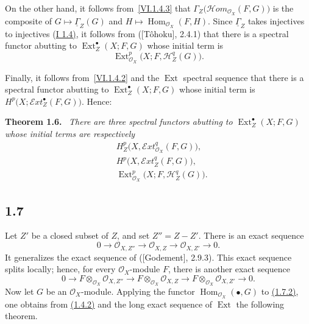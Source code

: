 \documentclass[11pt,a4paper,oneside]{book}
\providecommand{\SheafGamma}{\underline{\Gamma}}
\providecommand{\SheafH}{\mathcal H}
\providecommand{\SheafHom}{\mathcal H\!om}
\providecommand{\SheafExt}{\mathcal E\!xt}
\providecommand{\OX}{\mathcal O_X}
\providecommand{\OXZ}[1]{\mathcal O_{X,#1}}
\providecommand{\Homop}{\operatorname{Hom}}
\providecommand{\Ext}{\operatorname{Ext}}
\newenvironment{sgastatement}[1]
  {\par\addvspace{0.8\baselineskip}\noindent\textbf{#1.}\ \itshape}
  {\par\addvspace{0.35\baselineskip}}
\theoremstyle{plain}
\theoremstyle{definition}
\theoremstyle{remark}
\begin{document}
On the other hand, it follows from~\eqref{VI.1.4.3} that
$\Gamma_Z\bigl(\SheafHom_{\OX}(F,G)\bigr)$ is the composite of
$G\longmapsto\SheafGamma_Z(G)$ and
$H\longmapsto\Homop_{\OX}(F,H)$. Since $\SheafGamma_Z$ takes injectives to
injectives \textup{(\hyperref[I.1.4]{I 1.4)}}, it follows from \textup{([T\^ohoku], 2.4.1)}
that there is a spectral functor abutting to $\Ext_Z^{\bullet}(X;F,G)$ whose
initial term is
\[
 \Ext_{\OX}^p\bigl(X;F,\SheafH_Z^q(G)\bigr).
\]

Finally, it follows from~\eqref{VI.1.4.2} and the $\Ext$ spectral sequence
that there is a spectral functor abutting to $\Ext_Z^{\bullet}(X;F,G)$ whose
initial term is $H^p\bigl(X;\SheafExt_Z^{\bullet}(F,G)\bigr)$. Hence:

\begin{sgastatement}{Theorem 1.6}
There are three spectral functors abutting to
$\Ext_Z^{\bullet}(X;F,G)$ whose initial terms are respectively
\begin{align}
 &H_Z^p\bigl(X,\SheafExt_{\OX}^q(F,G)\bigr),
   \tag{1.6.1}\label{VI.1.6.1}\\[-0.15em]
 &H^p\bigl(X,\SheafExt_Z^q(F,G)\bigr),
   \tag{1.6.2}\label{VI.1.6.2}\\[-0.15em]
 &\Ext_{\OX}^p\bigl(X;F,\SheafH_Z^q(G)\bigr).
   \tag{1.6.3}\label{VI.1.6.3}
\end{align}
\end{sgastatement}

\subsection*{1.7}
Let $Z'$ be a closed subset of $Z$, and set $Z''=Z-Z'$. There is an exact
sequence
\begin{equation}
 0\longrightarrow \OXZ{Z''}\longrightarrow \OXZ{Z}
 \longrightarrow \OXZ{Z'}\longrightarrow 0.
 \tag{1.7.1}\label{VI.1.7.1}
\end{equation}
It generalizes the exact sequence of \textup{([Godement], 2.9.3)}. This exact
sequence splits locally; hence, for every $\OX$-module $F$, there is another
exact sequence
\begin{equation}
 0\longrightarrow F\otimes_{\OX}\OXZ{Z''}
 \longrightarrow F\otimes_{\OX}\OXZ{Z}
 \longrightarrow F\otimes_{\OX}\OXZ{Z'}\longrightarrow 0.
 \tag{1.7.2}\label{VI.1.7.2}
\end{equation}
Now let $G$ be an $\OX$-module. Applying the functor
$\Homop_{\OX}(\mathbin{\bullet},G)$ to \hyperref[VI.1.7.2]{(1.7.2)}, one obtains from \hyperref[VI.1.4.2]{(1.4.2)} and
the long exact sequence of $\Ext$ the following theorem.
\end{document}
